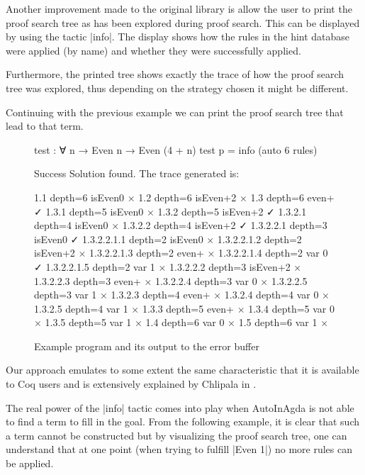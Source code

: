 \documentclass[a4paper]{article}
\begin{document}
Another improvement made to the original library is allow the user to print the
proof search tree as has been explored during proof search. This can be
displayed by using the tactic |info|. The display shows how the rules in the
hint database were applied (by name) and whether they were successfully applied.

Furthermore, the printed tree shows exactly the trace of how the proof search 
tree was explored, thus depending on the strategy chosen it might be different.

Continuing with the previous example we can print the proof search tree that
lead to that term.

\begin{figure}[h]
\noindent\begin{minipage}{.40\textwidth}
\scriptsize
\begin{code}
  test : ∀ {n} → Even n → Even (4 + n)
  test p = info (auto 6 rules)
\end{code}
\end{minipage}
\begin{minipage}{.55\textwidth}
\scriptsize
\begin{code}
Success Solution found. The trace generated is:

1.1 depth=6 isEven0 ×
1.2 depth=6 isEven+2 ×
1.3 depth=6 even+ ✓
1.3.1 depth=5 isEven0 ×
1.3.2 depth=5 isEven+2 ✓
1.3.2.1 depth=4 isEven0 ×
1.3.2.2 depth=4 isEven+2 ✓
1.3.2.2.1 depth=3 isEven0 ✓
1.3.2.2.1.1 depth=2 isEven0 ×
1.3.2.2.1.2 depth=2 isEven+2 ×
1.3.2.2.1.3 depth=2 even+ ×
1.3.2.2.1.4 depth=2 var 0 ✓
1.3.2.2.1.5 depth=2 var 1 ×
1.3.2.2.2 depth=3 isEven+2 ×
1.3.2.2.3 depth=3 even+ ×
1.3.2.2.4 depth=3 var 0 ×
1.3.2.2.5 depth=3 var 1 ×
1.3.2.3 depth=4 even+ ×
1.3.2.4 depth=4 var 0 ×
1.3.2.5 depth=4 var 1 ×
1.3.3 depth=5 even+ ×
1.3.4 depth=5 var 0 ×
1.3.5 depth=5 var 1 ×
1.4 depth=6 var 0 ×
1.5 depth=6 var 1 ×
\end{code}
\end{minipage}
  \caption{Example program and its output to the error buffer}
\end{figure}

Our approach emulates to some extent the same characteristic that it is
available to Coq users and is extensively explained by Chlipala in
\cite{9780262026659}.

The real power of the |info| tactic comes into play when AutoInAgda is not able
to find a term to fill in the goal. From the following example, it is clear that
such a term cannot be constructed but by visualizing the proof search tree, one
can understand that at one point (when trying to fulfill |Even 1|) no more rules
can be applied.
\end{document}
